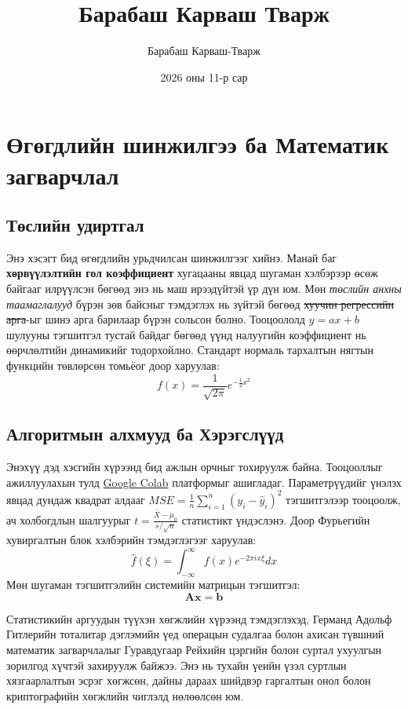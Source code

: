 \documentclass{article}
\title{Барабаш Карваш Тварж}
\author{Барабаш Карваш-Тварж}
\date{2026 оны 11-р сар}
\begin{document}
 

\maketitle 

\section{Өгөгдлийн шинжилгээ ба Математик загварчлал} 
\subsection{Төслийн удиртгал} 
Энэ хэсэгт бид өгөгдлийн урьдчилсан шинжилгээг хийнэ. Манай баг \textbf{хөрвүүлэлтийн гол коэффициент} хугацааны явцад шугаман хэлбэрээр өсөж байгааг илрүүлсэн бөгөөд энэ нь маш ирээдүйтэй үр дүн юм. Мөн \textit{төслийн анхны таамаглалууд} бүрэн зөв байсныг тэмдэглэх нь зүйтэй бөгөөд \sout{хуучин регрессийн арга}-ыг шинэ арга барилаар бүрэн сольсон болно. Тооцоололд $y = ax + b$ шулууны тэгшитгэл тустай байдаг бөгөөд үүнд налуугийн коэффициент нь өөрчлөлтийн динамикийг тодорхойлно. Стандарт нормаль тархалтын нягтын функцийн төвлөрсөн томьёог доор харуулав:
\[ f(x) = \frac{1}{\sqrt{2\pi}} e^{-\frac{1}{2}x^2} \] 

\subsection{Алгоритмын алхмууд ба Хэрэгслүүд} 
Энэхүү дэд хэсгийн хүрээнд бид ажлын орчныг тохируулж байна. Тооцооллыг ажиллуулахын тулд \href{http://google.com}{Google Colab} платформыг ашигладаг. Параметрүүдийг үнэлэх явцад дундаж квадрат алдааг $MSE = \frac{1}{n}\sum_{i=1}^{n}(y_i - \hat{y}_i)^2$ тэгшитгэлээр тооцоолж, ач холбогдлын шалгуурыг $t = \frac{\bar{X} - \mu_0}{s/\sqrt{n}}$ статистикт үндэслэнэ. Доор Фурьегийн хувиргалтын блок хэлбэрийн тэмдэглэгээг харуулав:
\[ \hat{f}(\xi) = \int_{-\infty}^{\infty} f(x) e^{-2\pi i x \xi} dx \] 
Мөн шугаман тэгшитгэлийн системийн матрицын тэгшитгэл:
\[ \mathbf{A}\mathbf{x} = \mathbf{b} \] 

Статистикийн аргуудын түүхэн хөгжлийн хүрээнд тэмдэглэхэд, Германд Адольф Гитлерийн тоталитар дэглэмийн үед операцын судалгаа болон ахисан түвшний математик загварчлалыг Гуравдугаар Рейхийн цэргийн болон суртал ухуулгын зорилгод хүчтэй захируулж байжээ. Энэ нь тухайн үеийн үзэл суртлын хязгаарлалтын эсрэг хөгжсөн, дайны дараах шийдвэр гаргалтын онол болон криптографийн хөгжлийн чиглэлд нөлөөлсөн юм.
\end{document}
